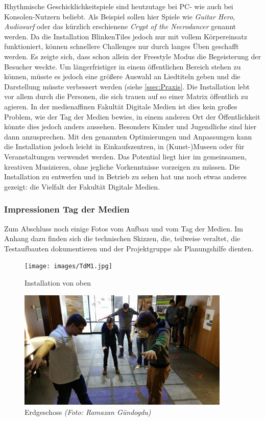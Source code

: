 
Rhythmische Geschicklichkeitspiele sind heutzutage bei PC- wie auch bei Konsolen-Nutzern beliebt. Als Beispiel sollen hier Spiele wie \textit{Guitar Hero}, \textit{Audiosurf} oder das kürzlich erschienene \textit{Crypt of the Necrodancer} genannt werden. Da die Installation BlinkenTiles jedoch nur mit vollem Körpereinsatz funktioniert, können schnellere Challenges nur durch langes Üben geschafft werden. Es zeigte sich, dass schon allein der Freestyle Modus die Begeisterung der Besucher weckte. Um längerfristiger in einem öffentlichen Bereich stehen zu können, müsste es jedoch eine größere Auswahl an Liedtiteln geben und die Darstellung müsste verbessert werden (siehe \autoref{ssec:Praxis}. Die Installation lebt vor allem durch die Personen, die sich trauen auf so einer Matrix öffentlich zu agieren. In der medienaffinen Fakultät Digitale Medien ist dies kein großes Problem, wie der Tag der Medien bewies, in einem anderen Ort der Öffentlichkeit könnte dies jedoch anders aussehen. Besonders Kinder und Jugendliche sind hier dann anzusprechen. Mit den genannten Optimierungen und Anpassungen kann die Installation jedoch leicht in Einkaufszentren, in (Kunst-)Museen oder für Veranstaltungen verwendet werden. Das Potential liegt hier im gemeinsamen, kreativen Musizieren, ohne jegliche Vorkenntnisse vorzeigen zu müssen. Die Installation zu entwerfen und in Betrieb zu sehen hat uns noch etwas anderes gezeigt: die Vielfalt der Fakultät Digitale Medien.

\subsubsection{Impressionen Tag der Medien}
Zum Abschluss noch einige Fotos vom Aufbau und vom Tag der Medien. Im Anhang dazu finden sich die technischen Skizzen, die, teilweise veraltet, die Testaufbauten dokumentieren und der Projektgruppe als Planungshilfe dienten.

\begin{figure}[htbp]
	\centering
		\texttt{[image: images/TdM1.jpg]}
	\caption{Installation von oben}
	\label{fig:TdM1}
\end{figure}

\begin{figure}[htbp]
	\centering
		\includegraphics[width=0.9\textwidth]{images/TdM2.jpg}
	\caption{Erdgeschoss \textit{(Foto: Ramazan Gündogdu)}}
	\label{fig:TdM2}
\end{figure}

